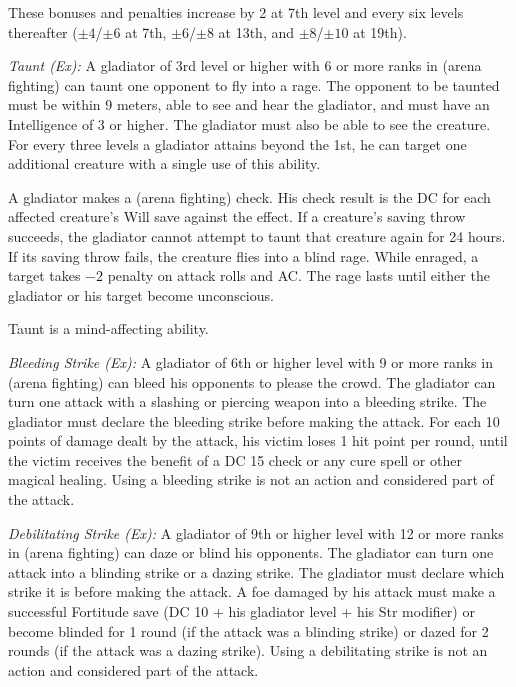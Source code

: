These bonuses and penalties increase by 2 at 7th level and every six levels thereafter ($\pm4$/$\pm6$ at 7th, $\pm6$/$\pm8$ at 13th, and $\pm8$/$\pm10$ at 19th).

\textit{Taunt (Ex):} A gladiator of 3rd level or higher with 6 or more ranks in  (arena fighting) can taunt one opponent to fly into a rage. The opponent to be taunted must be within 9 meters, able to see and hear the gladiator, and must have an Intelligence of 3 or higher. The gladiator must also be able to see the creature. For every three levels a gladiator attains beyond the 1st, he can target one additional creature with a single use of this ability.

A gladiator makes a  (arena fighting) check. His check result is the DC for each affected creature's Will save against the effect. If a creature's saving throw succeeds, the gladiator cannot attempt to taunt that creature again for 24 hours. If its saving throw fails, the creature flies into a blind rage. While enraged, a target takes $-2$ penalty on attack rolls and AC. The rage lasts until either the gladiator or his target become unconscious.

Taunt is a mind-affecting ability.

\textit{Bleeding Strike (Ex):} A gladiator of 6th or higher level with 9 or more ranks in  (arena fighting) can bleed his opponents to please the crowd. The gladiator can turn one attack with a slashing or piercing weapon into a bleeding strike. The gladiator must declare the bleeding strike before making the attack. For each 10 points of damage dealt by the attack, his victim loses 1 hit point per round, until the victim receives the benefit of a DC 15  check or any cure spell or other magical healing. Using a bleeding strike is not an action and considered part of the attack.

\textit{Debilitating Strike (Ex):} A gladiator of 9th or higher level with 12 or more ranks in  (arena fighting) can daze or blind his opponents. The gladiator can turn one attack into a blinding strike or a dazing strike. The gladiator must declare which strike it is before making the attack. A foe damaged by his attack must make a successful Fortitude save (DC 10 + \onehalf his gladiator level + his Str modifier) or become blinded for 1 round (if the attack was a blinding strike) or dazed for 2 rounds (if the attack was a dazing strike). Using a debilitating strike is not an action and considered part of the attack.

